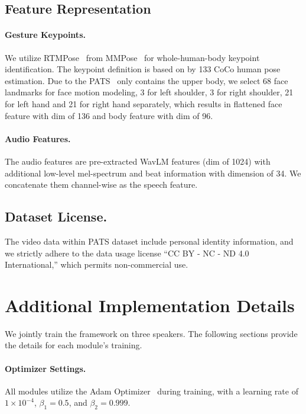 \subsection{Feature Representation}
\paragraph{Gesture Keypoints.} 
We utilize RTMPose~\cite{rtmpose} from MMPose~\cite{mmpose2020} for whole-human-body keypoint identification. The keypoint definition is based on by 133 CoCo human pose estimation. Due to the PATS~\cite{ginosar2019gestures} only contains the upper body, we select 68 face landmarks for face motion modeling, 3 for left shoulder, 3 for right shoulder, 21 for left hand and 21 for right hand separately, which results in flattened face feature with dim of 136 and body feature with dim of 96.

\paragraph{Audio Features.} 
The audio features are pre-extracted WavLM features (dim of 1024) with additional low-level mel-spectrum and beat information with dimension of 34. We concatenate them channel-wise as the speech feature.

\subsection{Dataset License.}
The video data within PATS dataset include personal identity information, and we strictly adhere to the data usage license ``CC BY - NC - ND 4.0 International,'' which permits non-commercial use.


\section{Additional Implementation Details}
\label{sec:sub-implement}


We jointly train the framework on three speakers. The following sections provide the details for each module's training.

\paragraph{Optimizer Settings.}
All modules utilize the Adam Optimizer~\cite{kingma2014adam} during training, with a learning rate of \(1 \times 10^{-4}\), \(\beta_1 = 0.5\), and \(\beta_2 = 0.999\).


